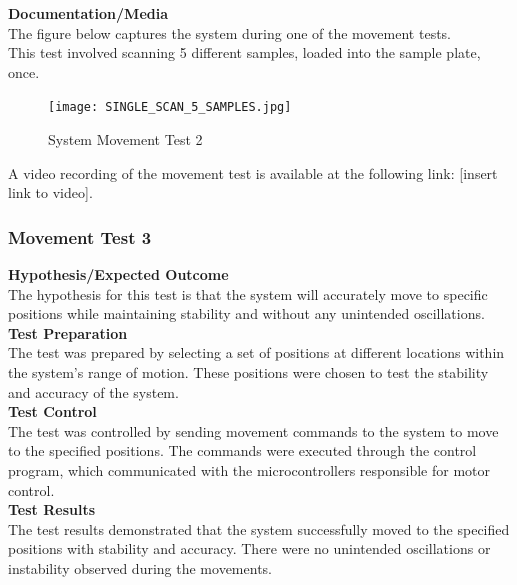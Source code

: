 \documentclass{UoNMCHA}
\numberwithin{equation}{section}
\begin{document}
\textbf{Documentation/Media}\\

The figure below captures the system during one of the movement tests.\\
This test involved scanning 5 different samples, loaded into the sample plate, once. \\

\begin{figure}[h]
	\centering
	\texttt{[image: SINGLE\_SCAN\_5\_SAMPLES.jpg]}
	\caption{System Movement Test 2}
	\label{fig:System Movement Test 2}
\end{figure}

A video recording of the movement test is available at the following link: [insert link to video].\\

\subsubsection{Movement Test 3}\label{subsub:Movement Test 3}
\textbf{Hypothesis/Expected Outcome}\\

The hypothesis for this test is that the system will accurately move to specific positions while maintaining stability and without any unintended oscillations.\\

\textbf{Test Preparation}\\

The test was prepared by selecting a set of positions at different locations within the system's range of motion. These positions were chosen to test the stability and accuracy of the system.\\

\textbf{Test Control}\\

The test was controlled by sending movement commands to the system to move to the specified positions. The commands were executed through the control program, which communicated with the microcontrollers responsible for motor control.\\

\textbf{Test Results}\\

The test results demonstrated that the system successfully moved to the specified positions with stability and accuracy. There were no unintended oscillations or instability observed during the movements.\\
\end{document}
